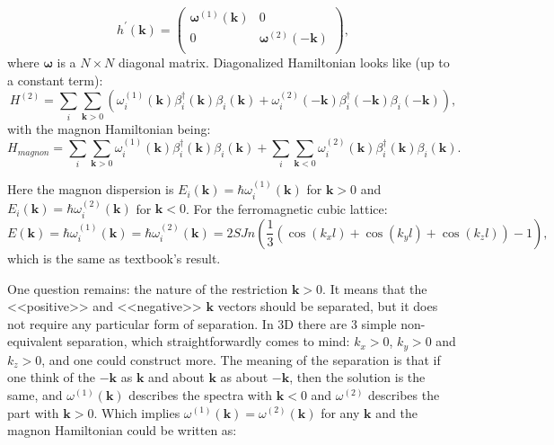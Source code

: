 \documentclass[a4paper,12pt]{article}
\begin{document}
            \begin{equation}
                h^{\prime}(\boldsymbol{k}) = 
                \begin{pmatrix}
                    \boldsymbol{\omega}^{(1)}(\boldsymbol{k}) & 0 \\
                    0 & \boldsymbol{\omega}^{(2)}(-\boldsymbol{k}) \\
                \end{pmatrix}, 
            \end{equation}
            where $\boldsymbol{\omega}$ is a $N\times N$  diagonal matrix. Diagonalized Hamiltonian looks like (up to a constant term):
            \begin{equation}
                H^{(2)} = \sum_{i}\sum_{\boldsymbol{k} > 0}\left(\omega_i^{(1)}(\boldsymbol{k})\beta^{\dag}_i(\boldsymbol{k})\beta_i(\boldsymbol{k}) + 
                \omega_i^{(2)}(-\boldsymbol{k})\beta^{\dag}_i(-\boldsymbol{k})\beta_i(-\boldsymbol{k})\right), \label{eq:colpa-diagonalized}
            \end{equation}
            with the magnon Hamiltonian being:
            \begin{equation}
                H_{magnon} = \sum_{i}\sum_{\boldsymbol{k} > 0}\omega_i^{(1)}(\boldsymbol{k})\beta^{\dag}_i(\boldsymbol{k})\beta_i(\boldsymbol{k}) + 
                \sum_{i}\sum_{\boldsymbol{k} < 0}\omega_i^{(2)}(\boldsymbol{k})\beta^{\dag}_i(\boldsymbol{k})\beta_i(\boldsymbol{k}).
            \end{equation}

            Here the magnon dispersion is $E_i(\boldsymbol{k}) = \hbar \omega_i^{(1)}(\boldsymbol{k})$ for $\boldsymbol{k} > 0$ and 
            $E_i(\boldsymbol{k}) = \hbar \omega_i^{(2)}(\boldsymbol{k})$ for $\boldsymbol{k} <0$.
            For the ferromagnetic cubic lattice:
            \begin{equation}
                E(\boldsymbol{k}) = 
                \hbar \omega_i^{(1)}(\boldsymbol{k}) =
                \hbar \omega_i^{(2)}(\boldsymbol{k}) = 
                2SJn\left(\dfrac{1}{3}\left(\cos(k_xl) + \cos(k_yl) + \cos(k_zl)\right) - 1\right),
            \end{equation}
            which is the same as textbook's result.


            One question remains: the nature of the restriction $ \boldsymbol{k} > 0$. It means that the <<positive>> and <<negative>> $\boldsymbol{k}$ vectors should be separated, 
            but it does not require any particular form of separation. In $3\text{D}$ there are 3 simple non-equivalent separation, 
            which straightforwardly comes to mind: $k_x > 0$, $k_y > 0$ and $k_z > 0$, and one could construct more. 
            The meaning of the separation is that if one think of the $-\boldsymbol{k}$ as $\boldsymbol{k}$ and about $\boldsymbol{k}$ as about $-\boldsymbol{k}$, 
            then the solution is the same, and $\omega^{(1)}(\boldsymbol{k})$ describes the spectra with $\boldsymbol{k} < 0$ 
            and $\omega^{(2)}$ describes the part with $\boldsymbol{k} > 0$. Which implies $\omega^{(1)}(\boldsymbol{k}) = \omega^{(2)}(\boldsymbol{k})$ 
            for any $\boldsymbol{k}$ and the magnon Hamiltonian could be written as:
\end{document}
